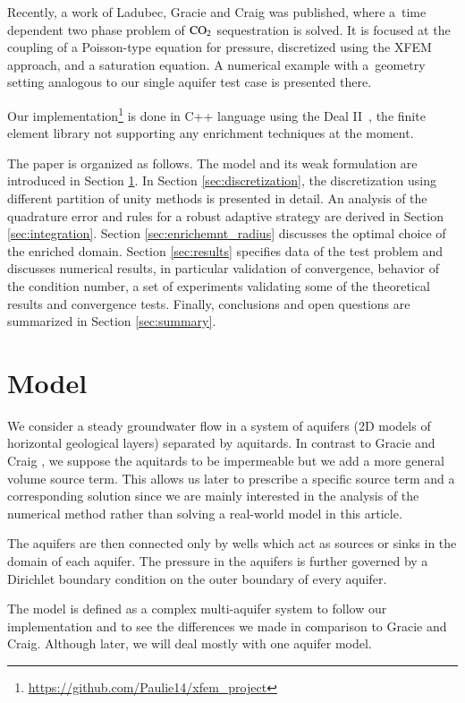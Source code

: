 \documentclass{elsarticle}
\begin{document}
Recently, a work of Ladubec, Gracie and Craig \cite{ladubec_extended_2014} was published, 
where a~time dependent two phase problem of $\rm{CO}_2$ sequestration is solved. 
It is focused at the coupling of a Poisson-type equation for pressure, discretized using the XFEM approach, 
and a saturation equation. A numerical example with a~geometry 
setting analogous to our single aquifer test case is presented there.

Our implementation\footnote{\url{https://github.com/Paulie14/xfem_project}}  is done in C++ language 
using the Deal II~\cite{bangerth_deal.ii_2007}, the finite element library
not supporting any enrichment techniques at the moment. 


The paper is organized as follows. The model and its weak formulation are introduced in Section \ref{sec:model}.
In Section \ref{sec:discretization}, the discretization using different partition of unity methods is presented in detail.
An analysis of the quadrature error and rules for a robust adaptive strategy are derived in Section \ref{sec:integration}.
Section \ref{sec:enrichemnt_radius} discusses the optimal choice of the enriched domain.
Section \ref{sec:results} specifies data of the test problem and discusses numerical results,
in particular validation of convergence, behavior of the condition number, a set of experiments validating some of the theoretical results and convergence tests.
Finally, conclusions and open questions are summarized in Section \ref{sec:summary}.

\section{Model}
\label{sec:model}
We consider a steady groundwater 
flow in a system of aquifers (2D models of horizontal geological layers) separated by aquitards. 
In contrast to Gracie and Craig \cite{gracie_modelling_2010}, we suppose the aquitards to be impermeable 
but we add a more general volume source term. This allows us later to prescribe a specific source term and 
a corresponding solution since we are mainly interested in the analysis of the numerical method rather than
solving a real-world model in this article. 

The aquifers are then connected only by wells 
which act as sources or sinks in the domain of each aquifer. The pressure in the aquifers is further governed 
by a Dirichlet boundary condition on the outer boundary of every aquifer.

The model is defined as a complex multi-aquifer system to follow our implementation and to see the differences
we made in comparison to Gracie and Craig. Although later, we will deal mostly with one aquifer model.
\end{document}
